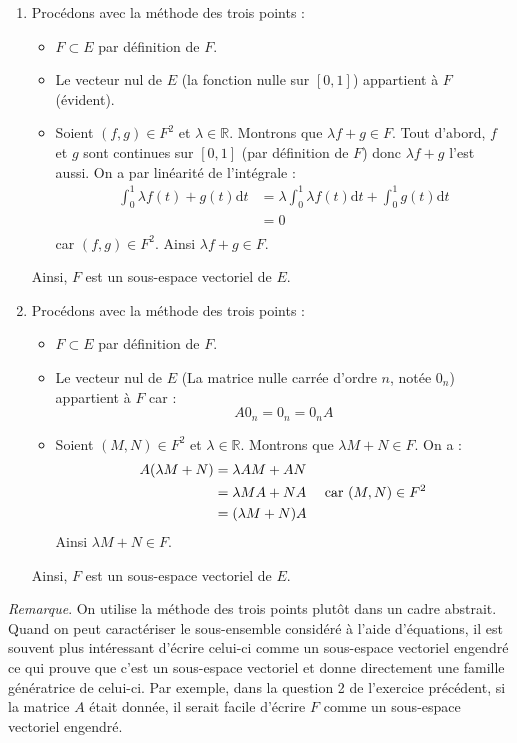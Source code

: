 \documentclass[a4paper,twoside,french,11pt]{VcCours}
\newcommand{\dt}{\text{d}t}
\begin{document}
\begin{enumerate}
\item Procédons avec la méthode des trois points :

\begin{itemize}
\item $F \subset E$ par définition de $F$.
\item Le vecteur nul de $E$ (la fonction nulle sur $[0,1]$) appartient à $F$ (évident).
\item Soient $(f,g) \in F^2$ et $\lambda \in \mathbb{R}$. Montrons que $\lambda f + g \in F$. Tout d'abord, $f$ et $g$ sont continues sur $[0,1]$ (par définition de $F$) donc $\lambda f+g$ l'est aussi. On a par linéarité de l'intégrale :
\begin{align*}
\int_{0}^1 \lambda f(t) + g(t) \dt & =\lambda \int_{0}^1 \lambda f(t) \dt+ \int_{0}^1  g(t) \dt  \\
& = 0 \\
\end{align*}
car $(f,g) \in F^2$. Ainsi $\lambda f + g \in F$.
\end{itemize}
Ainsi, $F$ est un sous-espace vectoriel de $E$.
\item Procédons avec la méthode des trois points :

\begin{itemize}
\item $F \subset E$ par définition de $F$.
\item Le vecteur nul de $E$ (La matrice nulle carrée d'ordre $n$, notée $0_n$) appartient à $F$ car :
$$ A 0_n = 0_n = 0_n A $$
\item Soient $(M,N) \in F^2$ et $\lambda \in \mathbb{R}$. Montrons que $\lambda M+ N  \in F$. On a :
\begin{align*}
A(\lambda M + N) & =\lambda AM + AN \\
& = \lambda MA + NA \quad \hbox{ car } (M,N) \in F^2 \\
& = (\lambda M + N) A \\
\end{align*}
Ainsi $\lambda M + N \in F$.
\end{itemize}
Ainsi, $F$ est un sous-espace vectoriel de $E$.
\end{enumerate}




\noindent \textit{Remarque}. On utilise la méthode des trois points plutôt dans un cadre abstrait. Quand on peut caractériser le sous-ensemble considéré à l'aide d'équations, il est souvent plus intéressant d'écrire celui-ci comme un sous-espace vectoriel engendré ce qui prouve que c'est un sous-espace vectoriel et donne directement une famille génératrice de celui-ci. Par exemple, dans la question 2 de l'exercice précédent, si la matrice $A$ était donnée, il serait facile d'écrire $F$ comme un sous-espace vectoriel engendré.
\end{document}
